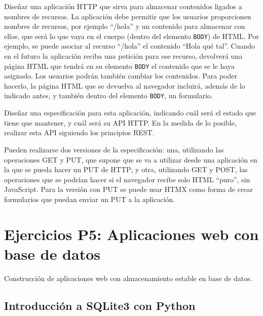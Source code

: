 Diseñar una aplicación HTTP que sirva para almacenar contenidos ligados a nombres de recursos. La aplicación debe permitir que los usuarios proporcionen nombres de recursos, por ejemplo ``/hola'' y un contenido para almacenar con ellos, que será lo que vaya en el cuerpo (dentro del elemento \texttt{BODY}) de HTML. Por ejemplo, se puede asociar al recurso ``/hola'' el contenido ``Hola qué tal''. Cuando en el futuro la aplicación reciba una petición para ese recurso, devolverá una página HTML que tendrá en su elemento \texttt{BODY} el contenido que se le haya asignado. Los usuarios podrán también cambiar los contenidos. Para poder hacerlo, la página HTML que se devuelva al navegador incluirá, además de lo indicado antes, y también dentro del elemento  \texttt{BODY}, un formulario.

Diseñar una especificación para esta aplicación, indicando cuál será el estado que tiene que mantener, y cuál será su API HTTP. En la medida de lo posible, realizar esta API siguiendo los principios REST.

Pueden realizarse dos versiones de la especificación: una, utilizando las operaciones GET y PUT, que supone que se va a utilizar desde una aplicación en la que se pueda hacer un PUT de HTTP; y otra, utilizando GET y POST, las operaciones que se podrían hacer si el navegador recibe solo HTML ``puro'', sin JavaScript. Para la versión con PUT se puede usar HTMX como forma de crear formularios que puedan enviar un PUT a la aplicación.


\section{Ejercicios P5: Aplicaciones web con base de datos}

Construcción de aplicaciones web con almacenamiento estable en base de datos.

\subsection{Introducción a SQLite3 con Python}
\label{subsec:sqlite3-python}

